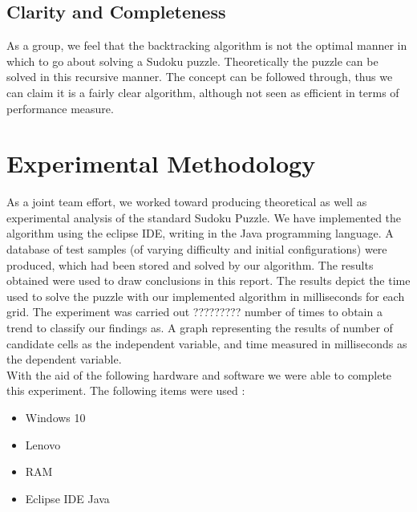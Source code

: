 \documentclass[12pt]{article}
\begin{document}
\subsection{Clarity and Completeness}
\begin{flushleft}
As a group, we feel that the backtracking algorithm is not the optimal manner in which to go about solving a Sudoku puzzle. Theoretically the puzzle can be solved in this recursive manner. The concept can be followed through, thus we can claim it is a fairly clear algorithm, although not seen as efficient in terms of performance measure. 
\end{flushleft}

\section{Experimental Methodology}
As a joint team effort, we worked toward producing theoretical as well as experimental analysis of the standard Sudoku Puzzle. We have implemented the algorithm using the eclipse IDE, writing in the Java programming language. A database of test samples (of varying difficulty and initial configurations) were produced, which had been stored and solved by our algorithm. The results obtained were used to draw conclusions in this report. The results depict the time used to solve the puzzle with our implemented algorithm in milliseconds for each grid. The experiment was carried out ????????? number of times to obtain a trend to classify our findings as. A graph representing the results of number of candidate cells as the independent variable, and time measured in milliseconds as the dependent variable. \\
With the aid of the following hardware and software we were able to complete this experiment. The following items were used :
\begin{itemize}
\item Windows 10
\item Lenovo 
\item RAM
\item Eclipse IDE Java
\end{itemize}
\end{document}
